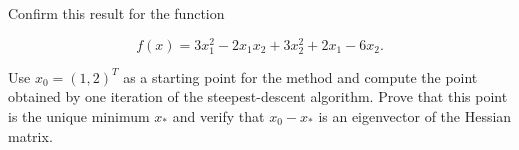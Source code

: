 Confirm this result for the function 

$$
f(x) = 3 x_1^2 - 2 x_1 x_2 + 3 x_2^2 + 2 x_1 - 6 x_2.
$$

Use $x_0 = (1, 2)^T$ as a starting point for the method and compute the point obtained by one iteration of the 
steepest-descent algorithm. Prove that this point is the unique minimum $x_*$ and verify that $x_0 - x_*$ is an
eigenvector of the Hessian matrix.

\begin{solution}
    \ \\
    \vfill
\end{solution}